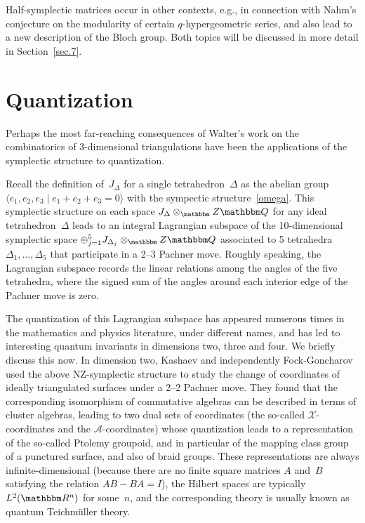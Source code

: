 \documentclass[12pt,reqno]{amsart}
\theoremstyle{definition}
\def\BZ{\mathbbm Z}
\def\BQ{\mathbbm Q}
\def\BR{\mathbbm R}
\def\D{\Delta}
\begin{document}
Half-symplectic matrices occur in other contexts, e.g., in connection with Nahm's
conjecture on the modularity of certain $q$-hypergeometric series, and also lead to a new
description of the Bloch group. Both topics will be discussed in more detail in
Section~\ref{sec.7}.


\section{Quantization}
\label{sec.6}

Perhaps the most far-reaching consequences of Walter's work on the combinatorics of
3-dimensional triangulations have been the applications of the symplectic structure
to quantization.  

Recall the definition of~$J_\D$ for a single tetrahedron~$\D$ as the abelian group
$\langle e_1,e_2,e_3\mid e_1+e_2+e_3=0\rangle$ with the sympectic structure~\eqref{omega}.
This symplectic structure on each space $J_\Delta \otimes_\BZ \BQ$ for any
ideal tetrahedron~$\Delta$ leads to an integral Lagrangian subspace of the
10-dimensional symplectic space \hbox{$\oplus_{j=1}^5 J_{\Delta_j} \otimes_\BZ\BQ$} associated
to 5 tetrahedra $\Delta_1,\dots,\Delta_5$  that participate in a 2--3 Pachner move.
Roughly speaking, the Lagrangian subspace records the linear relations among the
angles of the five tetrahedra, where the signed sum of the angles around each interior 
edge of the Pachner move is zero. 

The quantization of this Lagrangian subspace has appeared numerous times in the
mathematics and physics literature, under different names, and has led to interesting
quantum invariants in dimensions two, three and four. We briefly discuss this now.
In dimension two, Kashaev and independently Fock-Goncharov~\cite{Kashaev:quantization,FG0,FG} 
used the above NZ-symplectic structure to
study the change of coordinates of ideally triangulated surfaces under a 2--2 Pachner
move. They found that the corresponding isomorphism of commutative algebras can be
described in terms of cluster algebras, leading to two dual sets of coordinates
(the so-called $\mathcal{X}$-coordinates and the $\mathcal{A}$-coordinates) whose
quantization leads to a representation of the so-called Ptolemy groupoid, and in 
particular of the mapping class group of a punctured surface, and also of braid groups.
These representations are always infinite-dimensional (because there are no finite square
matrices $A$ and~$B$ satisfying the relation $AB-BA=I$), the Hilbert spaces are typically
$L^2(\BR^n)$ for some~$n$, and the corresponding theory is usually known as quantum 
Teichm\"uller theory.
\end{document}
